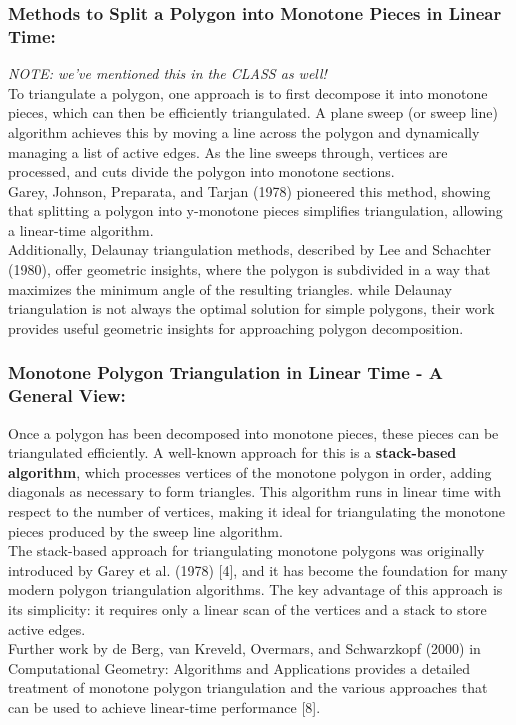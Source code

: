 \documentclass{article}
\begin{document}
\subsubsection*{Methods to Split a Polygon into Monotone Pieces in Linear Time: }
\textit{NOTE: we've mentioned this in the CLASS as well!}
\\
To triangulate a polygon, one approach is to first decompose it into monotone pieces, which can then be efficiently triangulated. A plane sweep (or sweep line) algorithm achieves this by moving a line across the polygon and dynamically managing a list of active edges. As the line sweeps through, vertices are processed, and cuts divide the polygon into monotone sections.
\\
Garey, Johnson, Preparata, and Tarjan (1978) pioneered this method, showing that splitting a polygon into y-monotone pieces simplifies triangulation, allowing a linear-time algorithm. 
\\
Additionally, Delaunay triangulation methods, described by Lee and Schachter (1980), offer geometric insights, where the polygon is subdivided in a way that maximizes the minimum angle of the resulting triangles. while Delaunay triangulation is not always the optimal solution for simple polygons, their work provides useful geometric insights for approaching polygon decomposition.

\subsubsection*{Monotone Polygon Triangulation in Linear Time - A General View: }
Once a polygon has been decomposed into monotone pieces, these pieces can be triangulated efficiently. A well-known approach for this is a \textbf{stack-based algorithm}, which processes vertices of the monotone polygon in order, adding diagonals as necessary to form triangles. This algorithm runs in linear time with respect to the number of vertices, making it ideal for triangulating the monotone pieces produced by the sweep line algorithm.
\\
The stack-based approach for triangulating monotone polygons was originally introduced by Garey et al. (1978) [4], and it has become the foundation for many modern polygon triangulation algorithms. The key advantage of this approach is its simplicity: it requires only a linear scan of the vertices and a stack to store active edges.
\\
Further work by de Berg, van Kreveld, Overmars, and Schwarzkopf (2000) in Computational Geometry: Algorithms and Applications provides a detailed treatment of monotone polygon triangulation and the various approaches that can be used to achieve linear-time performance [8].
\end{document}
